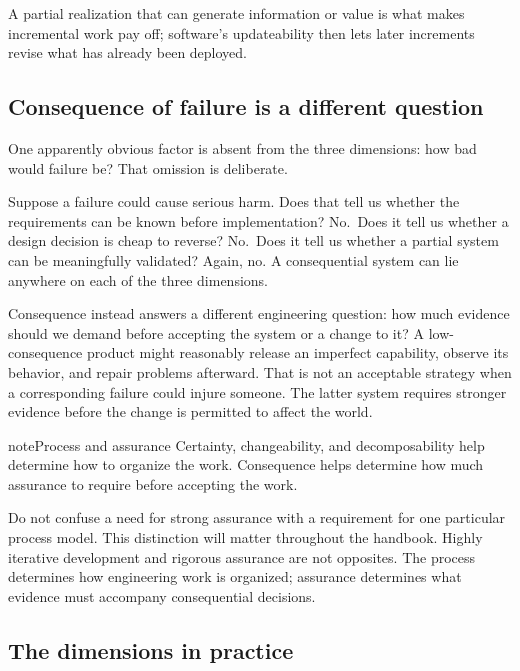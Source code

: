 A partial realization that can generate information or value is what makes incremental work pay off;
software's updateability then lets later increments revise what has already been deployed.

\subsection{Consequence of failure is a different question}\label{sec-consequence}

One apparently obvious factor is absent from the three dimensions: how bad would failure be? That
omission is deliberate.

Suppose a failure could cause serious harm. Does that tell us whether the requirements can be known before
implementation? No.~Does it tell us whether a design decision is cheap to reverse? No.~Does it tell us
whether a partial system can be meaningfully validated? Again, no. A consequential system can lie
anywhere on each of the three dimensions.

Consequence instead answers a different engineering question: how much evidence should we demand before
accepting the system or a change to it? A low-consequence product might reasonably release an
imperfect capability, observe its behavior, and
repair problems afterward. That is not an acceptable strategy when a corresponding failure could injure
someone. The latter system requires stronger evidence before the change is permitted to affect the world.

\begin{bookbox}{note}{Process and assurance} %
Certainty, changeability, and decomposability help determine how to organize the work. Consequence helps
determine how much assurance to require before accepting the work.
\end{bookbox}

Do not confuse a need for strong assurance with a requirement for one particular process model. This
distinction will matter throughout the handbook. Highly iterative development and rigorous assurance are
not opposites. The process determines how engineering work is organized; assurance determines what
evidence must accompany consequential decisions.

\subsection{The dimensions in practice}\label{sec-dimensions-in-practice}


